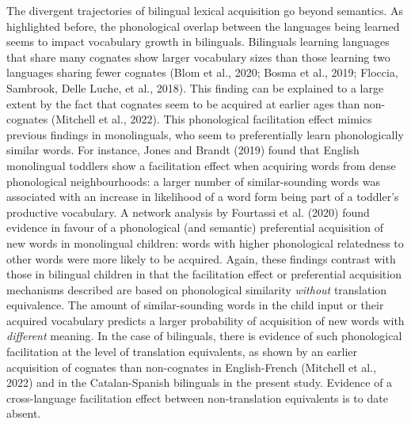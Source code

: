 \documentclass[
  man,
  floatsintext,
  colorlinks=true,linkcolor=blue,citecolor=blue,urlcolor=blue,biblatex]{apa7}
\begin{document}
The divergent trajectories of bilingual lexical acquisition go beyond
semantics. As highlighted before, the phonological overlap between the
languages being learned seems to impact vocabulary growth in bilinguals.
Bilinguals learning languages that share many cognates show larger
vocabulary sizes than those learning two languages sharing fewer
cognates (Blom et al., 2020; Bosma et al., 2019; Floccia, Sambrook,
Delle Luche, et al., 2018). This finding can be explained to a large
extent by the fact that cognates seem to be acquired at earlier ages
than non-cognates (Mitchell et al., 2022). This phonological
facilitation effect mimics previous findings in monolinguals, who seem
to preferentially learn phonologically similar words. For instance,
Jones and Brandt (2019) found that English monolingual toddlers show a
facilitation effect when acquiring words from dense phonological
neighbourhoods: a larger number of similar-sounding words was associated
with an increase in likelihood of a word form being part of a toddler's
productive vocabulary. A network analysis by Fourtassi et al. (2020)
found evidence in favour of a phonological (and semantic) preferential
acquisition of new words in monolingual children: words with higher
phonological relatedness to other words were more likely to be acquired.
Again, these findings contrast with those in bilingual children in that
the facilitation effect or preferential acquisition mechanisms described
are based on phonological similarity \emph{without} translation
equivalence. The amount of similar-sounding words in the child input or
their acquired vocabulary predicts a larger probability of acquisition
of new words with \emph{different} meaning. In the case of bilinguals,
there is evidence of such phonological facilitation at the level of
translation equivalents, as shown by an earlier acquisition of cognates
than non-cognates in English-French (Mitchell et al., 2022) and in the
Catalan-Spanish bilinguals in the present study. Evidence of a
cross-language facilitation effect between non-translation equivalents
is to date absent.
\end{document}
